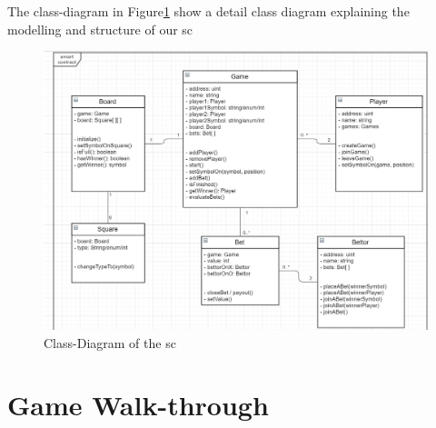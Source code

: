 The class-diagram in Figure\ref{fig:sc_uml}  show a detail class diagram explaining the modelling and structure of our \ac{sc}
	\begin{figure}[ht]
		\begin{center}
			\includegraphics[scale=0.22]{res/sc_uml}
		\end{center}
		\caption{Class-Diagram of the \ac{sc}}
		\label{fig:sc_uml}
	\end{figure}
\section{Game Walk-through}
